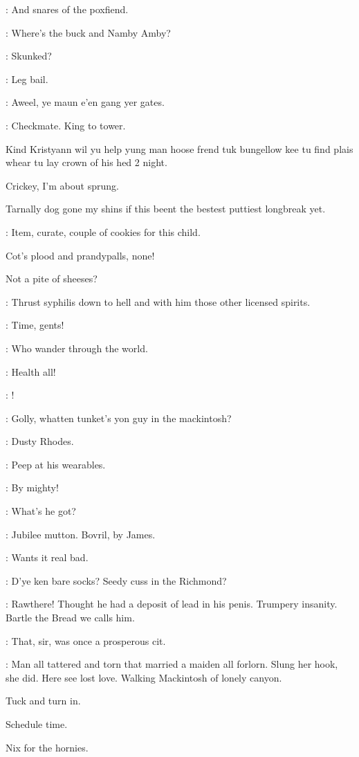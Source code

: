 \documentclass[12pt]{article}
\begin{document}
\SD: And snares of the poxfiend.

\BL: Where's the buck and Namby Amby?

\SD: Skunked?

\Ln: Leg bail.

\Cr: Aweel, ye maun e'en gang yer gates.

\SD: Checkmate. King to tower.

Kind Kristyann wil yu help yung man hoose frend
tuk bungellow kee tu find plais whear tu lay crown of his hed 2 night.

Crickey, I'm about sprung.

Tarnally dog gone my shins if this beent the
bestest puttiest longbreak yet.

\PC: Item, curate, couple of cookies for this child.

Cot's plood and prandypalls, none!

Not a pite of sheeses?

\SD: Thrust syphilis down to hell and with him those other licensed spirits.

\Br: Time, gents!

\SD: Who wander through the world.

\PC: Health all!

\Dx: !


\Cr: Golly, whatten tunket's yon guy in the mackintosh?

\Ln: Dusty Rhodes.

\Ly: Peep at his wearables.

\Cr: By mighty!

\SD: What's he got?

\Dx: Jubilee mutton.
Bovril, by James.

\Ln: Wants it real bad.

\Cr: D'ye ken bare socks?
Seedy cuss in the Richmond?

\Dx: Rawthere!
Thought he had a deposit of lead in his penis.
Trumpery insanity.
Bartle the Bread we calls him.

\Ly: That, sir, was once a prosperous cit.

\Bl: Man all tattered and torn that married a maiden all forlorn.
Slung her hook, she did.
Here see lost love.
Walking Mackintosh of lonely canyon.

Tuck and turn in.

Schedule time.

Nix for the hornies.
\end{document}
